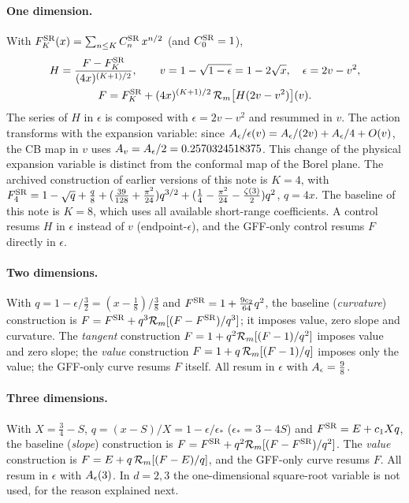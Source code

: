 \paragraph{One dimension.} With $F^{\rm SR}_K(x)=\sum_{n\le K}C^{\mathrm{SR}}_n\,x^{n/2}$ (and $C^{\mathrm{SR}}_0=1$),
\begin{equation}
 \begin{gathered}
 H=\frac{F-F^{\rm SR}_K}{(4x)^{(K+1)/2}},\qquad
 v=1-\sqrt{1-\epsilon}=1-2\sqrt{x},\quad \epsilon=2v-v^2,\\
 F=F^{\rm SR}_K+(4x)^{(K+1)/2}\,\mathcal R_m\bigl[H(2v-v^2)\bigr](v).
 \end{gathered}
 \label{rs:eq:endpoint1}
\end{equation}
The series of $H$ in $\epsilon$ is composed with $\epsilon=2v-v^2$ and resummed in $v$.
The action transforms with the expansion variable: since
$A_\epsilon/\epsilon(v)=A_\epsilon/(2v)+A_\epsilon/4+O(v)$, the CB map in $v$ uses
$A_v=A_\epsilon/2=0.2570324518375$. This change of the physical expansion variable is
distinct from the conformal map of the Borel plane. The archived construction of earlier
versions of this note is $K=4$, with
$F^{\rm SR}_4=1-\sqrt q+\frac q8+(\frac{39}{128}+\frac{\pi^2}{24})q^{3/2}
+(\frac14-\frac{\pi^2}{24}-\frac{\zeta(3)}2)q^2$, $q=4x$. The baseline of this note is
$K=8$, which uses all available short-range coefficients. A control resums $H$ in
$\epsilon$ instead of $v$ (endpoint-$\epsilon$), and the GFF-only control resums $F$
directly in $\epsilon$.

\paragraph{Two dimensions.} With $q=1-\epsilon/\frac32=(x-\frac18)/\frac38$ and
$F^{\rm SR}=1+\frac{9c_2}{64}q^2$, the baseline (\emph{curvature}) construction is
$F=F^{\rm SR}+q^3\mathcal R_m[(F-F^{\rm SR})/q^3]$; it imposes value, zero slope and curvature. The
\emph{tangent} construction $F=1+q^2\mathcal R_m[(F-1)/q^2]$ imposes value and zero slope; the
\emph{value} construction $F=1+q\,\mathcal R_m[(F-1)/q]$ imposes only the value; the
GFF-only curve resums $F$ itself. All resum in $\epsilon$ with
$A_\epsilon=\frac98$.

\paragraph{Three dimensions.} With $X=\frac34-S$, $q=(x-S)/X=1-\epsilon/\epsilon_*$
($\epsilon_*=3-4S$) and $F^{\rm SR}=E+c_1Xq$, the baseline (\emph{slope}) construction is
$F=F^{\rm SR}+q^2\mathcal R_m[(F-F^{\rm SR})/q^2]$. The \emph{value} construction is
$F=E+q\,\mathcal R_m[(F-E)/q]$, and the GFF-only curve resums $F$. All resum in
$\epsilon$ with $A_\epsilon(3)$. In $d=2,3$ the one-dimensional square-root variable is not used,
for the reason explained next.

